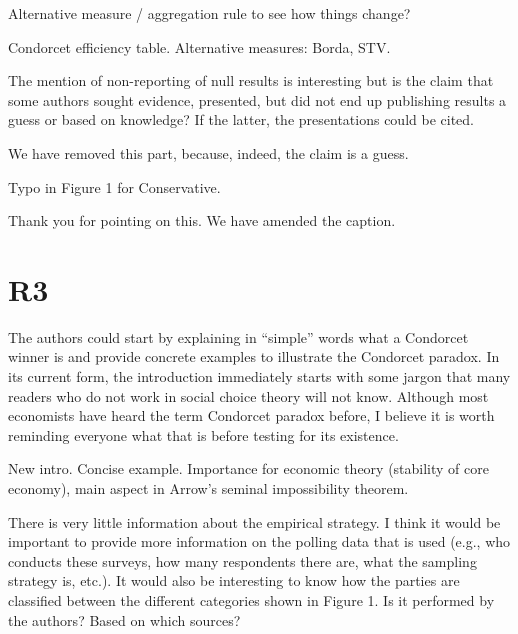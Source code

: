 \documentclass[a4paper, 12pt]{scrartcl}
\theoremstyle{break}
\newenvironment{changes}{\par\color{violet}\par\addvspace{\baselineskip}}{\par\addvspace{\baselineskip}}
\begin{document}
\begin{changes}
Alternative measure / aggregation rule to see how things change?
\end{changes}

Condorcet efficiency table. Alternative measures: Borda, STV. 

\begin{changes}
	The mention of non-reporting of null results is interesting but is the claim that some authors sought evidence, presented, but did not end up publishing results a guess or based on knowledge? If the latter, the presentations could be cited.
\end{changes}

We have removed this part, because, indeed, the claim is a guess.

\begin{changes}
	Typo in Figure 1 for Conservative.
\end{changes}
Thank you for pointing on this. We have amended the caption. 

\newpage
\section{R3}

\begin{changes}
	The authors could start by explaining in “simple” words what a Condorcet winner is and provide concrete examples to illustrate the Condorcet paradox. In its current form, the introduction immediately starts with some jargon that many readers who do not work in
	social choice theory will not know. Although most economists have heard the term Condorcet paradox before, I believe it is worth reminding everyone what that is before testing for its existence.
\end{changes}

New intro. Concise example. Importance for economic theory (stability of core economy), main aspect in Arrow's seminal impossibility theorem. 

\begin{changes}
	There is very little information about the empirical strategy. I think it would be important to provide more information on the polling data that is used (e.g., who conducts these surveys, how many respondents there are, what the sampling strategy is, etc.). It would also be
	interesting to know how the parties are classified between the different categories shown in Figure 1. Is it performed by the authors? Based on which sources?
\end{changes}
\end{document}
